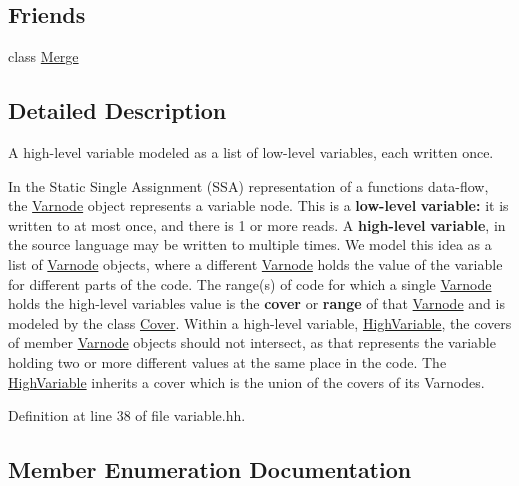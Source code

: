 \subsection*{Friends}
\begin{DoxyCompactItemize}
\item 
class \mbox{\hyperlink{class_high_variable_ada039d79291c7baead36ca12c2f1737b}{Merge}}
\end{DoxyCompactItemize}


\subsection{Detailed Description}
A high-\/level variable modeled as a list of low-\/level variables, each written once. 

In the Static Single Assignment (S\+SA) representation of a function\textquotesingle{}s data-\/flow, the \mbox{\hyperlink{class_varnode}{Varnode}} object represents a variable node. This is a {\bfseries{low-\/level}} {\bfseries{variable\+:}} it is written to at most once, and there is 1 or more reads. A {\bfseries{high-\/level}} {\bfseries{variable}}, in the source language may be written to multiple times. We model this idea as a list of \mbox{\hyperlink{class_varnode}{Varnode}} objects, where a different \mbox{\hyperlink{class_varnode}{Varnode}} holds the value of the variable for different parts of the code. The range(s) of code for which a single \mbox{\hyperlink{class_varnode}{Varnode}} holds the high-\/level variable\textquotesingle{}s value is the {\bfseries{cover}} or {\bfseries{range}} of that \mbox{\hyperlink{class_varnode}{Varnode}} and is modeled by the class \mbox{\hyperlink{class_cover}{Cover}}. Within a high-\/level variable, \mbox{\hyperlink{class_high_variable}{High\+Variable}}, the covers of member \mbox{\hyperlink{class_varnode}{Varnode}} objects should not intersect, as that represents the variable holding two or more different values at the same place in the code. The \mbox{\hyperlink{class_high_variable}{High\+Variable}} inherits a cover which is the union of the covers of its Varnodes. 

Definition at line 38 of file variable.\+hh.



\subsection{Member Enumeration Documentation}
\mbox{\label{class_high_variable_aedc1558735706370d950fecdb08e348c}} 
